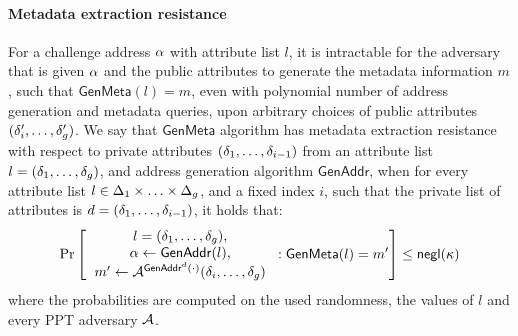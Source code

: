 \paragraph{Metadata extraction resistance}
For a challenge address $\alpha$ with attribute list $l$, it is intractable for
the  adversary that is given $\alpha$ and the public attributes to generate the
metadata information $m$, such that $\mathsf{GenMeta}(l) = m$, even with
polynomial number of address generation and metadata queries, upon arbitrary
choices of public attributes
$(\delta^\prime_{i}, \dots, \delta^\prime_{g})$. We say that
$\mathsf{GenMeta}$ algorithm has metadata extraction resistance with respect to
private attributes $(\delta_{1}, \dots, \delta_{i-1})$ from an attribute
list $l=(\delta_{1}, \dots, \delta_{g})$, and address generation
algorithm $\mathsf{GenAddr}$, when for every attribute list $l \in \Delta_1
\times \ldots \times \Delta_g$, and a fixed index $i$, such that
the private list of attributes is $d = (\delta_1, \dots, \delta_{i-1})$,
it holds that:
\begin{align}
    \Pr\left[
    \begin{tabular}{c}
        $l = (\attribute_{1}, \dots, \attribute_\addrgenlength)$, \\
        $\addr \leftarrow \mathsf{GenAddr}(l)$, \\
        $m^\prime \leftarrow \adv^{\mathsf{GenAddr}^{d}(\cdot)}(\attribute_{i}, \dots, \attribute_\addrgenlength)$ \\
    \end{tabular}
    :
    \mathsf{GenMeta}(l)=m^\prime
    \right]
    \leq \negl(\secparam) \nonumber
\end{align}
where the probabilities are computed on the used randomness, the values of $l$
and every PPT adversary $\mathcal{A}$.

